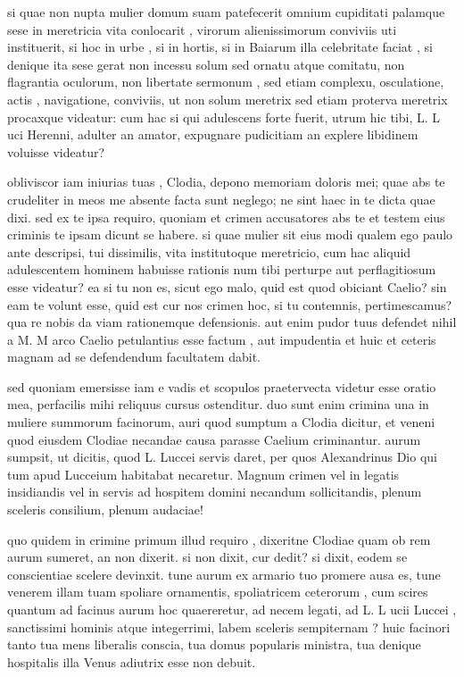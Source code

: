  si quae non nupta mulier domum suam patefecerit omnium cupiditati palamque sese in meretricia vita conlocarit , virorum alienissimorum conviviis uti instituerit, si hoc in urbe , si in hortis, si in Baiarum illa celebritate faciat , si denique ita sese gerat non incessu solum sed ornatu atque comitatu, non flagrantia oculorum, non libertate sermonum , sed etiam complexu, osculatione, actis , navigatione, conviviis, ut non solum meretrix sed etiam proterva meretrix procaxque videatur: cum hac si qui adulescens forte fuerit, utrum hic tibi, L. L uci Herenni, adulter an amator, expugnare pudicitiam an explere libidinem voluisse videatur?

 obliviscor iam iniurias tuas , Clodia, depono memoriam doloris mei; quae abs te crudeliter in meos me absente facta sunt neglego; ne sint haec in te dicta quae dixi. sed ex te ipsa requiro, quoniam et crimen accusatores abs te et testem eius criminis te ipsam dicunt se habere. si quae mulier sit eius modi qualem ego paulo ante descripsi, tui dissimilis, vita institutoque meretricio, cum hac aliquid adulescentem hominem habuisse rationis num tibi perturpe aut perflagitiosum esse videatur? ea si tu non es, sicut ego malo, quid est quod obiciant Caelio? sin eam te volunt esse, quid est cur nos crimen hoc, si tu contemnis, pertimescamus? qua re nobis da viam rationemque defensionis. aut enim pudor tuus defendet nihil a M. M arco Caelio petulantius esse factum , aut impudentia et huic et ceteris magnam ad se defendendum facultatem dabit.

 sed quoniam emersisse iam e vadis et scopulos praetervecta videtur esse oratio mea, perfacilis mihi reliquus cursus ostenditur. duo sunt enim crimina una in muliere summorum facinorum, auri quod sumptum a Clodia dicitur, et veneni quod eiusdem Clodiae necandae causa parasse Caelium criminantur. aurum sumpsit, ut dicitis, quod L. Luccei servis daret, per quos Alexandrinus Dio qui tum apud Lucceium habitabat necaretur. Magnum crimen vel in legatis insidiandis vel in servis ad hospitem domini necandum sollicitandis, plenum sceleris consilium, plenum audaciae!

 quo quidem in crimine primum illud requiro , dixeritne Clodiae quam ob rem aurum sumeret, an non dixerit. si non dixit, cur dedit? si dixit, eodem se conscientiae scelere devinxit. tune aurum ex armario tuo promere ausa es, tune venerem illam tuam spoliare ornamentis, spoliatricem ceterorum , cum scires quantum ad facinus aurum hoc quaereretur, ad necem legati, ad L. L ucii Luccei , sanctissimi hominis atque integerrimi, labem sceleris sempiternam ? huic facinori tanto tua mens liberalis conscia, tua domus popularis ministra, tua denique hospitalis illa Venus adiutrix esse non debuit.

